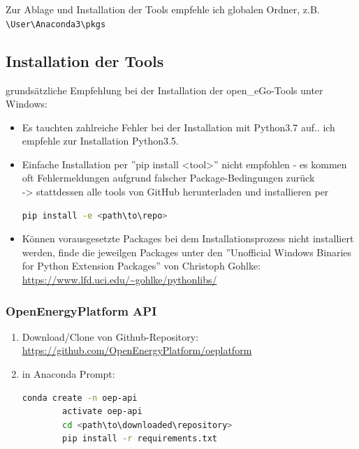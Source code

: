 \documentclass[
a4paper,     %
12pt         %
]{scrartcl}  %
\begin{document}
Zur Ablage und Installation der Tools empfehle ich globalen Ordner, z.B.
\texttt{ \textbackslash User\textbackslash Anaconda3\textbackslash pkgs}

\subsection{Installation der Tools}
grundsätzliche Empfehlung bei der Installation der open\_eGo-Tools unter Windows:
\begin{itemize}
\item Es tauchten zahlreiche Fehler bei der Installation mit Python3.7 auf.. ich empfehle zur Installation Python3.5.
\item Einfache Installation per ''pip install <tool>'' nicht empfohlen - es kommen oft Fehlermeldungen aufgrund falscher Package-Bedingungen zurück\\
-> stattdessen alle tools von GitHub herunterladen und installieren per
 \begin{lstlisting}[language=bash]
 pip install -e <path\to\repo>
 \end{lstlisting}

\item Können vorausgesetzte Packages bei dem Installationsprozess nicht installiert werden, finde die jeweilgen Packages unter den ''Unofficial Windows Binaries for Python Extension Packages'' von Christoph Gohlke:
\url{https://www.lfd.uci.edu/~gohlke/pythonlibs/}
\end{itemize}

\subsubsection{OpenEnergyPlatform API}
\begin{enumerate}
	\item Download/Clone von Github-Repository: \url{https://github.com/OpenEnergyPlatform/oeplatform}
	\item in Anaconda Prompt:
	\begin{lstlisting}[language=bash]
		conda create -n oep-api
		activate oep-api
		cd <path\to\downloaded\repository>
		pip install -r requirements.txt
	\end{lstlisting}
\end{enumerate}
\end{document}
